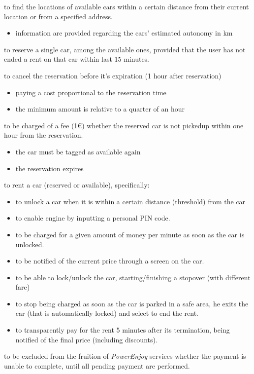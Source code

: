 \documentclass[english]{article}
\newcommand{\powerenjoy}{\textit{PowerEnjoy }}
\newcounter{reqId}
\newenvironment{requirementsgroup}
		{
			\newcommand{\req}[1]{ 
				\stepcounter{reqId} 
				\hypertarget{R\arabic{reqId}}{
					\item[
						 R.\arabic{reqId}
					]{ ##1 }
				}
			}
			\begin{description}
		}
		{
			\end{description}
		}
\begin{document}
	\begin{requirementsgroup}
		 \req { to find the locations of available cars within a certain distance from their current location or from a specified address.
			\begin{itemize}
				\item{information are provided regarding the cars' estimated autonomy in km }
			\end{itemize}
		 }
		 \req { to reserve a single car, among the available ones, provided that the user has not ended a rent on that car within last 15 minutes. }
		 \req { to cancel the reservation before it's expiration (1 hour after reservation)
			\begin{itemize}
				\item{paying a cost proportional to the reservation time }
				\item{the minimum amount is relative to a quarter of an hour}
			\end{itemize}
		}
		 \req { to be charged of a fee (1\euro) whether the reserved car is not picked\textendash up within one hour from the reservation.
			\begin{itemize}
				\item{the car must be tagged as available again }
				\item{the reservation expires}
			\end{itemize}
		 }

		 \req { to rent a car (reserved or available), specifically:
			\begin{itemize}
				\item { to unlock a car when it is within a certain distance (threshold) from the car }
				\item { to enable engine by inputting a personal PIN code. }
				\item { to be charged for a given amount of money per minute as soon as the car is unlocked. } 
			 	\item { to be notified of the current price through a screen on the car. }
			 	\item { to be able to lock/unlock the car, starting/finishing a stopover (with different fare) }
			 	\item { to stop being charged as soon as the car is parked in a safe area, he exits the car (that is automatically locked) and select to end the rent. }
				\item { to transparently pay for the rent 5 minutes after its termination, being notified of the final price (including discounts). }
			\end{itemize}
		 }
		 \req { to be excluded from the fruition of \powerenjoy services whether the payment is unable to complete, until all pending payment are performed.  }


\end{requirementsgroup}
\end{document}
